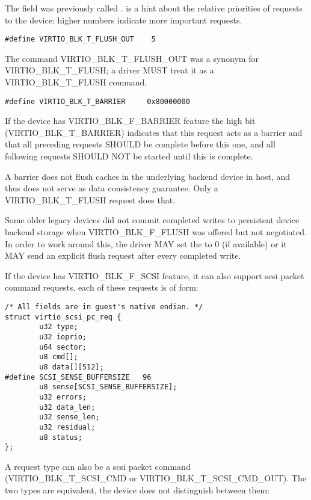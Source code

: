 The  field was previously called .  
is a hint about the relative priorities of requests to the device:
higher numbers indicate more important requests.

\begin{lstlisting}
#define VIRTIO_BLK_T_FLUSH_OUT    5
\end{lstlisting}

The command VIRTIO_BLK_T_FLUSH_OUT was a synonym for VIRTIO_BLK_T_FLUSH;
a driver MUST treat it as a VIRTIO_BLK_T_FLUSH command.

\begin{lstlisting}
#define VIRTIO_BLK_T_BARRIER     0x80000000
\end{lstlisting}

If the device has VIRTIO_BLK_F_BARRIER
feature the high bit (VIRTIO_BLK_T_BARRIER) indicates that this
request acts as a barrier and that all preceding requests SHOULD be
complete before this one, and all following requests SHOULD NOT be
started until this is complete.

\begin{note} A barrier does not flush
caches in the underlying backend device in host, and thus does not
serve as data consistency guarantee.  Only a VIRTIO_BLK_T_FLUSH request
does that.
\end{note}

Some older legacy devices did not commit completed writes to persistent
device backend storage when VIRTIO_BLK_F_FLUSH was offered but not
negotiated.  In order to work around this, the driver MAY set the
 to 0 (if available) or it MAY send an explicit flush
request after every completed write.

If the device has VIRTIO_BLK_F_SCSI feature, it can also support
scsi packet command requests, each of these requests is of form:

\begin{lstlisting}
/* All fields are in guest's native endian. */
struct virtio_scsi_pc_req {
        u32 type;
        u32 ioprio;
        u64 sector;
        u8 cmd[];
        u8 data[][512];
#define SCSI_SENSE_BUFFERSIZE   96
        u8 sense[SCSI_SENSE_BUFFERSIZE];
        u32 errors;
        u32 data_len;
        u32 sense_len;
        u32 residual;
        u8 status;
};
\end{lstlisting}

A request type can also be a scsi packet command (VIRTIO_BLK_T_SCSI_CMD or
VIRTIO_BLK_T_SCSI_CMD_OUT).  The two types are equivalent, the device
does not distinguish between them:

